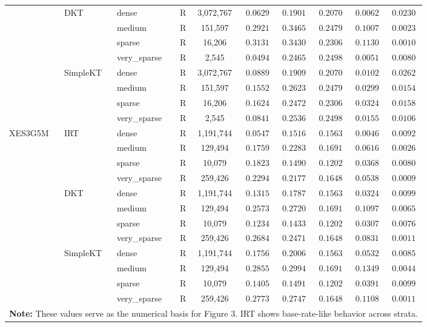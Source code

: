 \begin{table}[H]
{\begin{tabular}{lllrcccccc}
 & DKT & dense & R & 3,072,767 & $0.0629$ & $0.1901$ & $0.2070$ & $0.0062$ & $0.0230$ \\
 &  & medium & R & 151,597 & $0.2921$ & $0.3465$ & $0.2479$ & $0.1007$ & $0.0023$ \\
 &  & sparse & R & 16,206 & $0.3131$ & $0.3430$ & $0.2306$ & $0.1130$ & $0.0010$ \\
 &  & very\_sparse & R & 2,545 & $0.0494$ & $0.2465$ & $0.2498$ & $0.0051$ & $0.0080$ \\
 & SimpleKT & dense & R & 3,072,767 & $0.0889$ & $0.1909$ & $0.2070$ & $0.0102$ & $0.0262$ \\
 &  & medium & R & 151,597 & $0.1552$ & $0.2623$ & $0.2479$ & $0.0299$ & $0.0154$ \\
 &  & sparse & R & 16,206 & $0.1624$ & $0.2472$ & $0.2306$ & $0.0324$ & $0.0158$ \\
 &  & very\_sparse & R & 2,545 & $0.0841$ & $0.2536$ & $0.2498$ & $0.0155$ & $0.0106$ \\
\midrule
XES3G5M & IRT & dense & R & 1,191,744 & $0.0547$ & $0.1516$ & $0.1563$ & $0.0046$ & $0.0092$ \\
 &  & medium & R & 129,494 & $0.1759$ & $0.2283$ & $0.1691$ & $0.0616$ & $0.0026$ \\
 &  & sparse & R & 10,079 & $0.1823$ & $0.1490$ & $0.1202$ & $0.0368$ & $0.0080$ \\
 &  & very\_sparse & R & 259,426 & $0.2294$ & $0.2177$ & $0.1648$ & $0.0538$ & $0.0009$ \\
 & DKT & dense & R & 1,191,744 & $0.1315$ & $0.1787$ & $0.1563$ & $0.0324$ & $0.0099$ \\
 &  & medium & R & 129,494 & $0.2573$ & $0.2720$ & $0.1691$ & $0.1097$ & $0.0065$ \\
 &  & sparse & R & 10,079 & $0.1234$ & $0.1433$ & $0.1202$ & $0.0307$ & $0.0076$ \\
 &  & very\_sparse & R & 259,426 & $0.2684$ & $0.2471$ & $0.1648$ & $0.0831$ & $0.0011$ \\
 & SimpleKT & dense & R & 1,191,744 & $0.1756$ & $0.2006$ & $0.1563$ & $0.0532$ & $0.0085$ \\
 &  & medium & R & 129,494 & $0.2855$ & $0.2994$ & $0.1691$ & $0.1349$ & $0.0044$ \\
 &  & sparse & R & 10,079 & $0.1405$ & $0.1491$ & $0.1202$ & $0.0391$ & $0.0099$ \\
 &  & very\_sparse & R & 259,426 & $0.2773$ & $0.2747$ & $0.1648$ & $0.1108$ & $0.0011$ \\
\bottomrule
\multicolumn{10}{p{17.5cm}}{\scriptsize \textbf{Note:} These values serve as the numerical basis for Figure 3. IRT shows base-rate-like behavior across strata.} \\
\end{tabular}%
}
\end{table}

